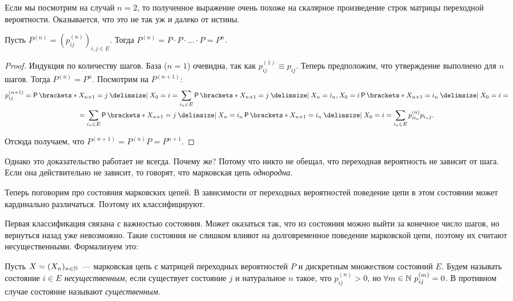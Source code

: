 Если мы посмотрим на случай \(n = 2\), то полученное выражение очень похоже на 
скалярное произведение строк матрицы переходной вероятности. Оказывается, что 
это не так уж и далеко от истины.
\begin{theorem}
	Пусть \(P^{(n)} = (p_{ij}^{(n)})_{i,j \in E}\). Тогда \(P^{(n)} = P \cdot 
	P \cdot \ldots \cdot P = P^{n}\).
\end{theorem}
\begin{proof}
	Индукция по количеству шагов. База (\(n = 1\)) очевидна, так как 
	\(p_{ij}^{(1)} \equiv p_{ij}\). Теперь предположим, что утверждение 
	выполнено для \(n\) шагов. Тогда \(P^{(n)} = P^{n}\). Посмотрим на \(P^{(n 
	+ 1)}\):
	\begin{multline*}
		p_{ij}^{(n + 1)} = \Pr{X_{n + 1} = j \given X_{0} = i} = \sum_{i_{n} 
		\in E} \Pr{X_{n + 1} = j \given X_{n} = i_{n}, X_{0} = i}\Pr{X_{n + 1} 
		= i_{n} \given X_{0} = i} = \\ = \sum_{i_{n} \in E} \Pr{X_{n + 1} = j 
		\given X_{n} = i_{n}}\Pr{X_{n + 1} = i_{n} \given X_{0} = i} = 
		\sum_{i_{n} \in E} p_{ii_{n}}^{(n)}p_{i_{n}j}.
	\end{multline*}
	
	Отсюда получаем, что \(P^{(n + 1)} = P^{(n)}P = P^{n + 1}\).
\end{proof}

Однако это доказательство работает не всегда. Почему же? Потому что никто не 
обещал, что переходная вероятность не зависит от шага. Если она действительно 
не зависит, то говорят, что марковская цепь \emph{однородна}.

Теперь поговорим про состояния марковских цепей. В зависимости от переходных 
вероятностей поведение цепи в этом состоянии может кардинально различаться. 
Поэтому их классифицируют.

Первая классификация связана с важностью состояния. Может оказаться так, что из 
состояния можно выйти за конечное число шагов, но вернуться назад уже 
невозможно. Такие состояния не слишком влияют на долговременное поведение 
марковской цепи, поэтому их считают несущественными. Формализуем это:

\begin{definition}
	Пусть \(X = (X_{n})_{n \in \mathbb{N}}\)~--- марковская цепь с матрицей переходных 
	вероятностей \(P\) и дискретным множеством состояний \(E\). Будем называть 
	состояние \(i \in E\) \emph{несущественным}, если существует состояние 
	\(j\) и натуральное \(n\) такое, что \(p_{ij}^{(n)} > 0\), но \(\forall m 
	\in \mathbb{N}\ p_{ij}^{(m)} = 0\). В противном случае состояние называют 
	\emph{существенным}.
\end{definition}

